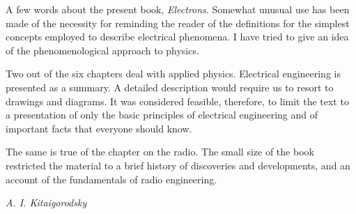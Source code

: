 A few words about the present book, \emph{Electrons}. Somewhat unusual use has been made of the necessity for reminding the reader of the definitions for the simplest concepts employed to describe electrical phenomena. I have tried to give an idea of the phenomenological approach to physics.

Two out of the six chapters deal with applied physics. Electrical engineering is presented as a summary. A detailed description would require us to resort to draw­ings and diagrams. It was considered feasible, therefore, to limit the text to a presentation of only the basic principles of electrical engineering and of important facts that everyone should know.

The same is true of the chapter on the radio. The small size of the book restricted the material to a brief history of discoveries and developments, and an account of the fundamentals of radio engineering.

\begin{flushright}
\emph{A. I. Kitaigorodsky}
\end{flushright}

